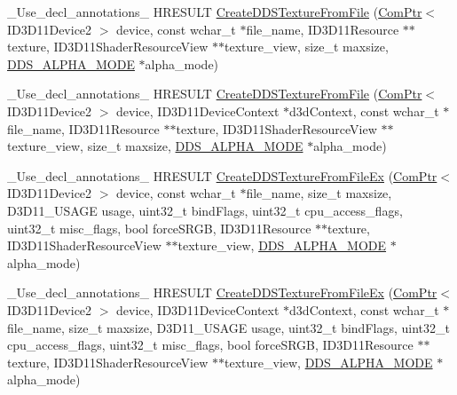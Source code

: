 \begin{DoxyCompactItemize}
\item 
\+\_\+\+Use\+\_\+decl\+\_\+annotations\+\_\+ H\+R\+E\+S\+U\+LT \hyperlink{namespacemage_a453361f8ce0316486ec3907547674224}{Create\+D\+D\+S\+Texture\+From\+File} (\hyperlink{namespacemage_ae74f374780900893caa5555d1031fd79}{Com\+Ptr}$<$ I\+D3\+D11\+Device2 $>$ device, const wchar\+\_\+t $\ast$file\+\_\+name, I\+D3\+D11\+Resource $\ast$$\ast$texture, I\+D3\+D11\+Shader\+Resource\+View $\ast$$\ast$texture\+\_\+view, size\+\_\+t maxsize, \hyperlink{namespacemage_a0c586a2bad862f4858900ca121ca80c2}{D\+D\+S\+\_\+\+A\+L\+P\+H\+A\+\_\+\+M\+O\+DE} $\ast$alpha\+\_\+mode)
\item 
\+\_\+\+Use\+\_\+decl\+\_\+annotations\+\_\+ H\+R\+E\+S\+U\+LT \hyperlink{namespacemage_a09b30fe2a483b0d96578ab720715e80a}{Create\+D\+D\+S\+Texture\+From\+File} (\hyperlink{namespacemage_ae74f374780900893caa5555d1031fd79}{Com\+Ptr}$<$ I\+D3\+D11\+Device2 $>$ device, I\+D3\+D11\+Device\+Context $\ast$d3d\+Context, const wchar\+\_\+t $\ast$file\+\_\+name, I\+D3\+D11\+Resource $\ast$$\ast$texture, I\+D3\+D11\+Shader\+Resource\+View $\ast$$\ast$texture\+\_\+view, size\+\_\+t maxsize, \hyperlink{namespacemage_a0c586a2bad862f4858900ca121ca80c2}{D\+D\+S\+\_\+\+A\+L\+P\+H\+A\+\_\+\+M\+O\+DE} $\ast$alpha\+\_\+mode)
\item 
\+\_\+\+Use\+\_\+decl\+\_\+annotations\+\_\+ H\+R\+E\+S\+U\+LT \hyperlink{namespacemage_a754e2e797656f47f2cfc1065fcddb470}{Create\+D\+D\+S\+Texture\+From\+File\+Ex} (\hyperlink{namespacemage_ae74f374780900893caa5555d1031fd79}{Com\+Ptr}$<$ I\+D3\+D11\+Device2 $>$ device, const wchar\+\_\+t $\ast$file\+\_\+name, size\+\_\+t maxsize, D3\+D11\+\_\+\+U\+S\+A\+GE usage, uint32\+\_\+t bind\+Flags, uint32\+\_\+t cpu\+\_\+access\+\_\+flags, uint32\+\_\+t misc\+\_\+flags, bool force\+S\+R\+GB, I\+D3\+D11\+Resource $\ast$$\ast$texture, I\+D3\+D11\+Shader\+Resource\+View $\ast$$\ast$texture\+\_\+view, \hyperlink{namespacemage_a0c586a2bad862f4858900ca121ca80c2}{D\+D\+S\+\_\+\+A\+L\+P\+H\+A\+\_\+\+M\+O\+DE} $\ast$alpha\+\_\+mode)
\item 
\+\_\+\+Use\+\_\+decl\+\_\+annotations\+\_\+ H\+R\+E\+S\+U\+LT \hyperlink{namespacemage_aa5397e65fcbb656f47ac0179ba94db1b}{Create\+D\+D\+S\+Texture\+From\+File\+Ex} (\hyperlink{namespacemage_ae74f374780900893caa5555d1031fd79}{Com\+Ptr}$<$ I\+D3\+D11\+Device2 $>$ device, I\+D3\+D11\+Device\+Context $\ast$d3d\+Context, const wchar\+\_\+t $\ast$file\+\_\+name, size\+\_\+t maxsize, D3\+D11\+\_\+\+U\+S\+A\+GE usage, uint32\+\_\+t bind\+Flags, uint32\+\_\+t cpu\+\_\+access\+\_\+flags, uint32\+\_\+t misc\+\_\+flags, bool force\+S\+R\+GB, I\+D3\+D11\+Resource $\ast$$\ast$texture, I\+D3\+D11\+Shader\+Resource\+View $\ast$$\ast$texture\+\_\+view, \hyperlink{namespacemage_a0c586a2bad862f4858900ca121ca80c2}{D\+D\+S\+\_\+\+A\+L\+P\+H\+A\+\_\+\+M\+O\+DE} $\ast$alpha\+\_\+mode)

\end{DoxyCompactItemize}
